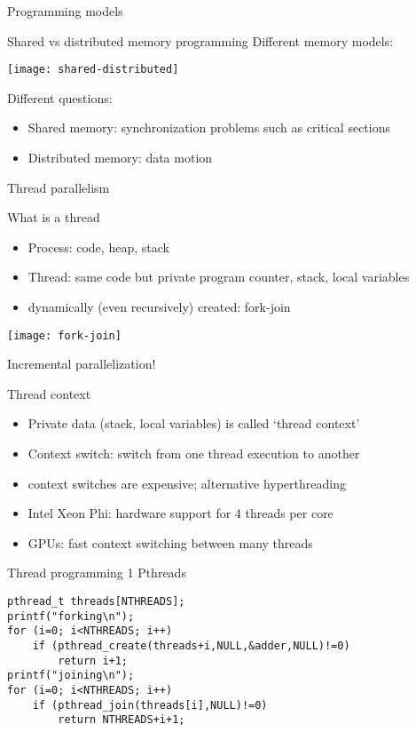  {Programming models}

\begin{numberedframe}{Shared vs distributed memory programming}
  Different memory models:

    \texttt{[image: shared-distributed]}

    Different questions:
    \begin{itemize}
    \item Shared memory: synchronization problems such as critical sections
    \item Distributed memory: data motion
    \end{itemize}
\end{numberedframe}

 {Thread parallelism}

\begin{numberedframe}{What is a thread}
  \begin{itemize}
  \item Process: code, heap, stack
  \item Thread: same code but private program counter, stack, local variables
  \item dynamically (even recursively) created: fork-join
  \end{itemize}
\texttt{[image: fork-join]}

Incremental parallelization!
\end{numberedframe}

\begin{numberedframe}{Thread context}
  \begin{itemize}
  \item Private data (stack, local variables) is called `thread context'
  \item Context switch: switch from one thread execution to another
  \item context switches are expensive; alternative hyperthreading
  \item Intel Xeon Phi: hardware support for 4 threads per core
  \item GPUs: fast context switching between many threads
  \end{itemize}
\end{numberedframe}

\begin{numberedframe}{Thread programming 1}
Pthreads
\begin{lstlisting}
pthread_t threads[NTHREADS];
printf("forking\n");
for (i=0; i<NTHREADS; i++)
    if (pthread_create(threads+i,NULL,&adder,NULL)!=0)
        return i+1;
printf("joining\n");
for (i=0; i<NTHREADS; i++)
    if (pthread_join(threads[i],NULL)!=0) 
        return NTHREADS+i+1;
\end{lstlisting}
\end{numberedframe}

